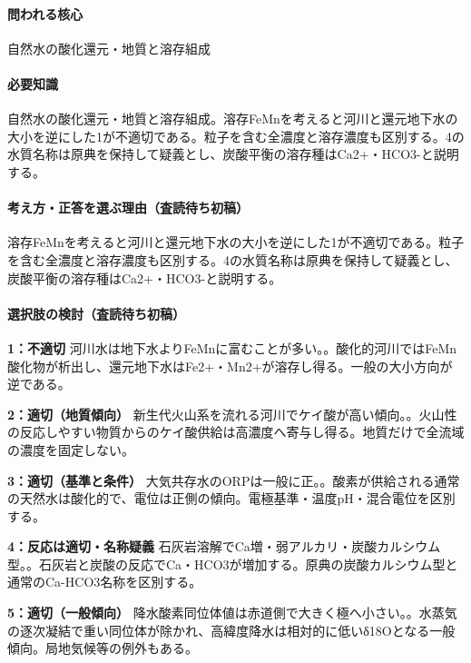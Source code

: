 \paragraph{問われる核心} 自然水の酸化還元・地質と溶存組成

\paragraph{必要知識} 自然水の酸化還元・地質と溶存組成。溶存FeMnを考えると河川と還元地下水の大小を逆にした1が不適切である。粒子を含む全濃度と溶存濃度も区別する。4の水質名称は原典を保持して疑義とし、炭酸平衡の溶存種はCa2+・HCO3-と説明する。

\paragraph{考え方・正答を選ぶ理由（査読待ち初稿）} 溶存FeMnを考えると河川と還元地下水の大小を逆にした1が不適切である。粒子を含む全濃度と溶存濃度も区別する。4の水質名称は原典を保持して疑義とし、炭酸平衡の溶存種はCa2+・HCO3-と説明する。

\paragraph{選択肢の検討（査読待ち初稿）}\mbox{}\par

\noindent\textbf{1：不適切} 河川水は地下水よりFeMnに富むことが多い。。酸化的河川ではFeMn酸化物が析出し、還元地下水はFe2+・Mn2+が溶存し得る。一般の大小方向が逆である。\par

\noindent\textbf{2：適切（地質傾向）} 新生代火山系を流れる河川でケイ酸が高い傾向。。火山性の反応しやすい物質からのケイ酸供給は高濃度へ寄与し得る。地質だけで全流域の濃度を固定しない。\par

\noindent\textbf{3：適切（基準と条件）} 大気共存水のORPは一般に正。。酸素が供給される通常の天然水は酸化的で、電位は正側の傾向。電極基準・温度pH・混合電位を区別する。\par

\noindent\textbf{4：反応は適切・名称疑義} 石灰岩溶解でCa増・弱アルカリ・炭酸カルシウム型。。石灰岩と炭酸の反応でCa・HCO3が増加する。原典の炭酸カルシウム型と通常のCa-HCO3名称を区別する。\par

\noindent\textbf{5：適切（一般傾向）} 降水酸素同位体値は赤道側で大きく極へ小さい。。水蒸気の逐次凝結で重い同位体が除かれ、高緯度降水は相対的に低いδ18Oとなる一般傾向。局地気候等の例外もある。\par

